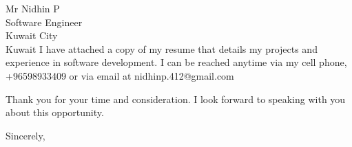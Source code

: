 \documentclass[11pt]{letter} %
\begin{document}
\begin{letter}{Mr Nidhin P \\
Software Engineer \\
Kuwait City \\
Kuwait}
I have attached a copy of my resume that details my projects and experience in software development. I can be reached anytime via my cell phone, +96598933409 or via email at nidhinp.412@gmail.com

Thank you for your time and consideration. I look forward to speaking with you about this opportunity.

\closing{Sincerely,}




\end{letter}
\end{document}
